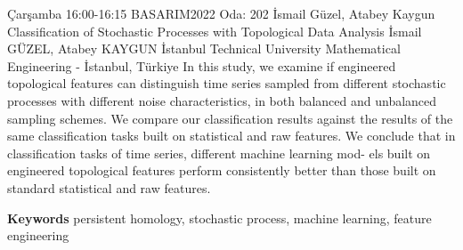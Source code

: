 
    \begin{abstract_basarim}
    {Çarşamba 16:00-16:15}
    {BASARIM2022}
    {Oda: 202}
    {İsmail Güzel, Atabey Kaygun}
    {Classification of Stochastic Processes with Topological Data Analysis}
    {%
    İsmail GÜZEL, Atabey KAYGUN}
    {%
    }
    {%
    İstanbul Technical University Mathematical Engineering - İstanbul, Türkiye}
    In this study, we examine if engineered topological features can distinguish time series sampled from different stochastic processes with different noise characteristics, in both balanced and unbalanced sampling schemes. We compare our classification results against the results of the same classification tasks built on statistical and raw features. We conclude that in classification tasks of time series, different machine learning mod- els built on engineered topological features perform consistently better than those built on standard statistical and raw features. 
    
        \textbf{Keywords} \newline{}persistent homology, stochastic process, machine learning, feature engineering
    \end{abstract_basarim}
    